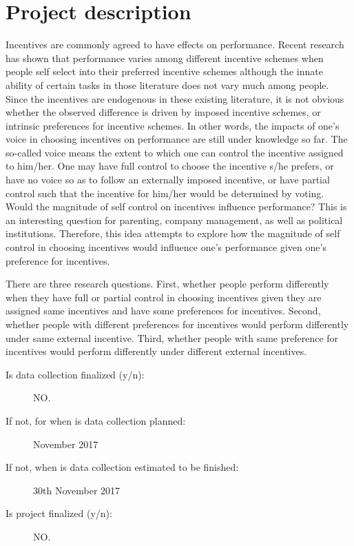 \documentclass[a4paper,10pt]{article}
\begin{document}
\section*{Project description}

Incentives are commonly agreed to have effects on performance. Recent research has shown that performance varies among different incentive schemes when people self select into their preferred incentive schemes although the innate ability of certain tasks in those literature does not vary much among people. Since the incentives are endogenous in these existing literature, it is not obvious whether the observed difference is driven by imposed incentive schemes, or intrinsic preferences for incentive schemes. In other words, the impacts of one's voice in choosing incentives on performance are still under knowledge so far. The so-called voice means the extent to which one can control the incentive assigned to him/her. One may have full control to choose the incentive s/he prefers, or have no voice so as to follow an externally imposed incentive, or have partial control such that the incentive for him/her would be determined by voting. Would the magnitude of self control on incentives influence performance? This is an interesting question for parenting, company management, as well as political institutions. Therefore, this idea attempts to explore how the magnitude of self control in choosing incentives would influence one's performance given one's preference for incentives.

\bigskip  

There are three research questions. First, whether people perform differently when they have full or partial control in choosing incentives given they are assigned same incentives and have some preferences for incentives. Second, whether people with different preferences for incentives would perform differently under same external incentive. Third, whether people with same preference for incentives would perform differently under different external incentives.

\begin{description}
\item[Is data collection finalized (y/n):] NO.
\item[If not, for when is data collection planned:] November 2017
\item[If not, when is data collection estimated to be finished:] 30th November 2017
\item[Is project finalized (y/n):] NO.
\end{description}
\end{document}
